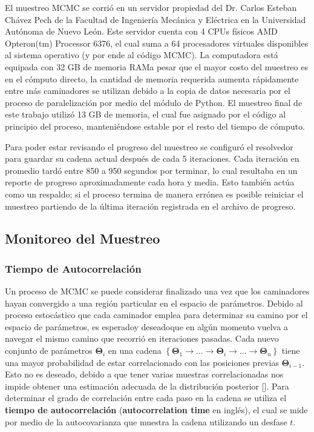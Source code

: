 El muestreo MCMC se corrió en un servidor propiedad del Dr. Carlos Esteban
Chávez Pech de la Facultad de Ingeniería Mecánica y Eléctrica en la Universidad
Autónoma de Nuevo León. Este servidor cuenta con 4 CPUs físicos AMD Opteron(tm)
Processor 6376, el cual suma a 64 procesadores virtuales disponibles al sistema
operativo (y por ende al código MCMC). La computadora está equipada con 32 GB de
memoria RAM\textemdash a pesar que el mayor costo del muestreo es en el cómputo
directo, la cantidad de memoria requerida aumenta rápidamente entre más
caminadores se utilizan debido a la copia de datos necesaria por el proceso de
paralelización por medio del módulo  de Python. El
muestreo final de este trabajo utilizó 13 GB de memoria, el cual fue asignado
por el código al principio del proceso, manteniéndose estable por el resto del
tiempo de cómputo.

Para poder estar revisando el progreso del muestreo se configuró el resolvedor
para guardar su cadena actual después de cada 5 iteraciones. Cada iteración en
promedio tardó entre 850 a 950 segundos por terminar, lo cual resultaba en un
reporte de progreso aproximadamente cada hora y media. Esto también actúa como
un respaldo; si el proceso termina de manera errónea es posible reiniciar el
muestreo partiendo de la última iteración registrada en el archivo de progreso. 

\subsection{Monitoreo del Muestreo}

\subsubsection{Tiempo de Autocorrelación}

Un proceso de MCMC se puede considerar finalizado una vez que los caminadores
hayan convergido a una región particular en el espacio de parámetros. Debido al
proceso estocástico que cada caminador emplea para determinar su camino por el
espacio de parámetros, es esperado\textemdash y deseado\textemdash que en algún
momento vuelva a navegar el mismo camino que recorrió en iteraciones pasadas.
Cada nuevo conjunto de parámetros $\mathbf{\Theta}_i$ en una cadena
$\left\{\mathbf{\Theta}_1 \rightarrow ... \rightarrow \mathbf{\Theta}_i
\rightarrow ... \rightarrow \mathbf{\Theta}_n \right\}$ tiene una mayor
probabilidad de estar correlacionado con las posiciones previas
$\mathbf{\Theta}_{i - 1}$. Esto no es deseado, debido a que tener varias
muestras correlacionadas nos impide obtener una estimación adecuada de la
distribución posterior [].
Para determinar el grado de correlación entre cada paso en la cadena se utiliza
el \textbf{tiempo de autocorrelación} (\textbf{autocorrelation time} en inglés),
el cual se mide por medio de la autocovarianza que muestra la cadena utilizando
un desfase $t$.

